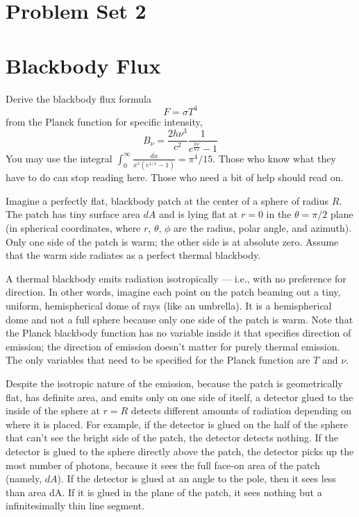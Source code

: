 \documentclass[11pt]{article}
\begin{document}
\pagestyle{empty}
\parindent=0pt

\section*{\centering Problem Set 2}


\section{Blackbody Flux}

Derive the blackbody flux formula
\begin{equation}
F=\sigma T^4
\end{equation}
from the Planck function for specific intensity,
\begin{equation}
B_\nu=\frac{2h\nu^3}{c^2}\frac{1}{e^\frac{h\nu}{kT} - 1}
\end{equation}
You may use the integral $\int_0^\infty{\frac{dx}{x^5(e^{1/x}-1)}}=\pi^4/15$.
Those who know what they have to do can stop reading here. Those who need a bit of help should read on.

Imagine a perfectly flat, blackbody patch at the center of a sphere of radius
$R$. The patch has tiny surface area $dA$ and is lying flat at $r = 0$ in the $\theta=\pi/2$
plane (in spherical coordinates, where $r$, $\theta$, $\phi$ are the radius, polar angle, and
azimuth). Only one side of the patch is warm; the other side is at absolute
zero. Assume that the warm side radiates as a perfect thermal blackbody.

A thermal blackbody emits radiation isotropically --- i.e., with no preference for
direction. In other words, imagine each point on the patch beaming out a tiny,
uniform, hemispherical dome of rays (like an umbrella). It is a hemispherical
dome and not a full sphere because only one side of the patch is warm. Note
that the Planck blackbody function has no variable inside it that specifies
direction of emission; the direction of emission doesn't matter for purely
thermal emission. The only variables that need to be specified for the Planck
function are $T$ and $\nu$.

Despite the isotropic nature of the emission, because the patch is
geometrically flat, has definite area, and emits only on one side of itself, a
detector glued to the inside of the sphere at $r = R$ detects different amounts
of radiation depending on where it is placed. For example, if the detector is
glued on the half of the sphere that can’t see the bright side of the patch,
the detector detects nothing. If the detector is glued to the sphere directly
above the patch, the detector picks up the most number of photons, because it
sees the full face-on area of the patch (namely, $dA$). If the detector is glued
at an angle to the pole, then it sees less than area dA. If it is glued in the
plane of the patch, it sees nothing but a infinitesimally thin line segment.
\end{document}

